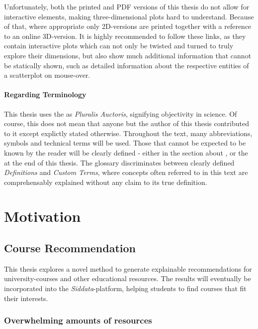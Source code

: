 Unfortunately, both the printed and PDF versions of this thesis do not allow for interactive elements, making three-dimensional plots hard to understand. Because of that, where appropriate only 2D-versions are printed together with a reference to an online 3D-version. It is highly recommended to follow these links, as they contain interactive plots which can not only be twisted and turned to truly explore their dimensions, but also show much additional information that cannot be statically shown, such as detailed information about the respective entities of a scatterplot on mouse-over.

\paragraph*{Regarding Terminology}

This thesis uses the  as \emph{Pluralis Auctoris}, signifying objectivity in science. Of course, this does not mean that anyone but the author of this thesis contributed to it except explictly stated otherwise. Throughout the text, many abbreviations, symbols and technical terms will be used. Those that cannot be expected to be known by the reader will be clearly defined - either in the section about , or the  at the end of this thesis. The glossary discriminates between clearly defined \textit{Definitions} and \textit{Custom Terms}, where concepts often referred to in this text are comprehensably explained without any claim to its true definition. 

\section{Motivation}

\subsection{Course Recommendation}

This thesis explores a novel method to generate explainable recommendations for university-courses and other educational resources. The results will eventually be incorporated into the \emph{Siddata}-platform, helping students to find courses that fit their interests.

\subsubsection*{Overwhelming amounts of resources}

